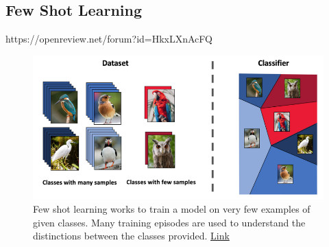 \documentclass{article}
\begin{document}
\newpage
\subsection{Few Shot Learning}
https://openreview.net/forum?id=HkxLXnAcFQ
\begin{figure}[H]
    \centering
    \includegraphics[width=4.5in]{fewshot.png}
    \caption{Few shot learning works to train a model on very few examples of given classes. Many training episodes are used to understand the distinctions between the classes provided.  \href{https://medium.com/sap-machine-learning-research/deep-few-shot-learning-a1caa289f18}{Link}}
    \label{fig:fewshot}
\end{figure}

%
%
\end{document}
